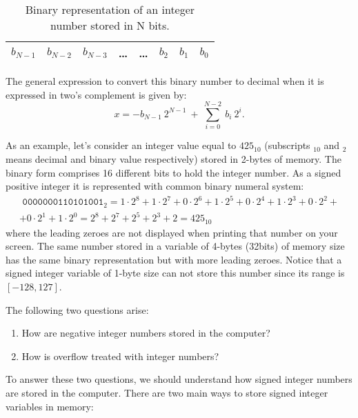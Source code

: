 \begin{table}[h]
    \centering
    \begin{tabular}{| c | c | c | c | c | c | c | c |}
        \hline
        $ b_{N-1} $  & $ b_{N-2} $ &  $ b_{N-3} $ &\ldots  & \ldots & $ b_{2} $  & $ b_{1} $ & $ b_{0} $ \\ \hline 
    \end{tabular}                                                       
    \caption{Binary representation of an integer number stored in N bits.}
    \label{bits}
\end{table}

The general expression to convert this binary number to decimal when it is expressed in two's complement is given by: 
\begin{equation} 
 x = - b_{N-1} \ 2 ^{ N-1 } \ + \ \sum_{i=0} ^{ N-2} \ b_i \ 2^i. 
 \label{reconstruction}
\end{equation} 

As an example, let's consider an integer value equal to $425_{10}$ (subscripts $_{10}$ and $_2$ means decimal and binary value respectively) stored in 2-bytes of memory.
The binary form comprises 16 different bits to hold the integer number. As a signed positive integer 
it is represented with common binary numeral system: 
\begin{multline*}
    \texttt{ 0000000110101001}_{2} = 1\cdot 2^8 +1\cdot 2^7+ 0\cdot 2^6+ 1\cdot 2^5+ 0\cdot 2^4+ 1\cdot 2^3+  0\cdot 2^2+ \\ + 0\cdot 2^1+ 1\cdot 
    2^0 = 2^8 + 2^7 + 2^5 + 2^3 + 2 = 425_{10}
\end{multline*}
where the leading zeroes are not displayed when printing that number on your screen. 
The same number stored in a variable of 4-bytes (32bits) of memory size
has the same binary representation but with more leading zeroes. 
Notice that a signed integer variable of 1-byte size can not store this number 
since its range is  $[-128, 127]$. 




The following two questions arise:
\begin{enumerate} 
\setlength\itemsep{0cm}
\item How are negative integer numbers stored in the computer? 
\item How is overflow treated with integer numbers? 
\end{enumerate} 

To answer these two questions, we should understand how signed integer  
numbers are stored in the computer. 
There are two main ways to store signed integer variables in memory: 

